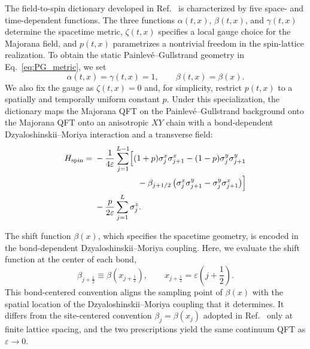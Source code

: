 \documentclass[reprint,amsmath,amssymb,aps,showkeys,superscriptaddress]{revtex4-2}
\begin{document}
The field-to-spin dictionary developed in
Ref.~\cite{Kinoshita2025} is characterized by five space- and
time-dependent functions. The three functions
$\alpha(t,x)$, $\beta(t,x)$, and $\gamma(t,x)$ determine the
spacetime metric, $\zeta(t,x)$ specifies a local gauge choice for the
Majorana field, and $p(t,x)$ parametrizes a nontrivial freedom in the
spin-lattice realization. To obtain the static
Painlev\'e--Gullstrand geometry in Eq.~\eqref{eq:PG_metric}, we set
\begin{equation}
  \alpha(t,x)=\gamma(t,x)=1,
  \qquad
  \beta(t,x)=\beta(x).
  \label{eq:dictionary_specialization}
\end{equation}
We also fix the gauge as $\zeta(t,x)=0$ and, for simplicity, restrict
$p(t,x)$ to a spatially and temporally uniform constant $p$. 
Under this specialization, the dictionary maps the Majorana QFT on
the Painlev\'e--Gullstrand background onto the
Majorana QFT onto an anisotropic $XY$ chain with a bond-dependent Dzyaloshinskii--Moriya interaction and a transverse field:
\begin{align}
  H_{\mathrm{spin}}
  ={}&
  -\frac{1}{4\varepsilon}
  \sum_{j=1}^{L-1}
  \Bigl[
    (1+p)\sigma_j^x\sigma_{j+1}^x
    -(1-p)\sigma_j^y\sigma_{j+1}^y
  \nonumber\\
  &\hspace{18mm}
    -\beta_{j+1/2}
    \left(
      \sigma_j^x\sigma_{j+1}^y
      -
      \sigma_j^y\sigma_{j+1}^x
    \right)
  \Bigr]
  \nonumber\\
  &-\frac{p}{2\varepsilon}
  \sum_{j=1}^{L}\sigma_j^z.
  \label{eq:spin_Hamiltonian}
\end{align}


The shift function $\beta(x)$, which specifies the spacetime geometry, is encoded in the bond-dependent
Dzyaloshinskii--Moriya coupling. Here, we evaluate the shift function at the center of each bond,
\begin{equation}
  \beta_{j+\frac12}
  \equiv
  \beta\left(x_{j+\frac12}\right),
  \qquad
  x_{j+\frac12}
  =
  \varepsilon\left(j+\frac12\right).
  \label{eq:lattice_beta}
\end{equation}
This bond-centered convention aligns the sampling point of
$\beta(x)$ with the spatial location of the
Dzyaloshinskii--Moriya coupling that it determines. It differs from
the site-centered convention
$\beta_j=\beta(x_j)$ adopted in Ref.~\cite{Kinoshita2025} only at
finite lattice spacing, and the two prescriptions yield the same
continuum QFT as $\varepsilon\to0$.
\end{document}
